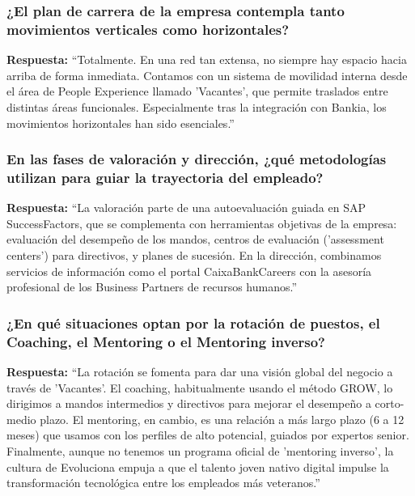 \subsubsection*{¿El plan de carrera de la empresa contempla tanto movimientos verticales como horizontales?}

\textbf{Respuesta:}\newline
``Totalmente. En una red tan extensa, no siempre hay espacio hacia arriba de forma inmediata. Contamos con un sistema de movilidad interna desde el área de People Experience llamado 'Vacantes', que permite traslados entre distintas áreas funcionales. Especialmente tras la integración con Bankia, los movimientos horizontales han sido esenciales.''

\subsubsection*{En las fases de valoración y dirección, ¿qué metodologías utilizan para guiar la trayectoria del empleado?}

\textbf{Respuesta:}\newline
``La valoración parte de una autoevaluación guiada en SAP SuccessFactors, que se complementa con herramientas objetivas de la empresa: evaluación del desempeño de los mandos, centros de evaluación ('assessment centers') para directivos, y planes de sucesión. En la dirección, combinamos servicios de información como el portal CaixaBankCareers con la asesoría profesional de los Business Partners de recursos humanos.''

\subsubsection*{¿En qué situaciones optan por la rotación de puestos, el Coaching, el Mentoring o el Mentoring inverso?}

\textbf{Respuesta:}\newline
``La rotación se fomenta para dar una visión global del negocio a través de 'Vacantes'. El coaching, habitualmente usando el método GROW, lo dirigimos a mandos intermedios y directivos para mejorar el desempeño a corto-medio plazo. El mentoring, en cambio, es una relación a más largo plazo (6 a 12 meses) que usamos con los perfiles de alto potencial, guiados por expertos senior. Finalmente, aunque no tenemos un programa oficial de 'mentoring inverso', la cultura de Evoluciona empuja a que el talento joven nativo digital impulse la transformación tecnológica entre los empleados más veteranos.''

